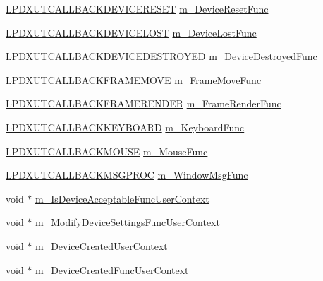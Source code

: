 \begin{DoxyCompactItemize}
\item 
\hyperlink{_d_x_u_t_8h_a67752d19953202f34e9f4d8826ee611a}{LPDXUTCALLBACKDEVICERESET} \hyperlink{struct_d_x_u_t_state_1_1_s_t_a_t_e_a43037d71aca77c10dffff7b8179b19af}{m\_\-DeviceResetFunc}
\item 
\hyperlink{_d_x_u_t_8h_a38bc1228fe056e0cd5860f48ee6291df}{LPDXUTCALLBACKDEVICELOST} \hyperlink{struct_d_x_u_t_state_1_1_s_t_a_t_e_ae96efa2807511ec6cb879e114ced252d}{m\_\-DeviceLostFunc}
\item 
\hyperlink{_d_x_u_t_8h_a1e80f441066b65558266d7a5770cbb6f}{LPDXUTCALLBACKDEVICEDESTROYED} \hyperlink{struct_d_x_u_t_state_1_1_s_t_a_t_e_af060474ffdb37388674f998c6aca5ea8}{m\_\-DeviceDestroyedFunc}
\item 
\hyperlink{_d_x_u_t_8h_a3eeca871425fb8ff60e4e76cbedebed4}{LPDXUTCALLBACKFRAMEMOVE} \hyperlink{struct_d_x_u_t_state_1_1_s_t_a_t_e_a252a76131c7d17c44841faf8abca7691}{m\_\-FrameMoveFunc}
\item 
\hyperlink{_d_x_u_t_8h_a16135d638bce122f8d286b028d027810}{LPDXUTCALLBACKFRAMERENDER} \hyperlink{struct_d_x_u_t_state_1_1_s_t_a_t_e_a84b307c15966a8fb5d91b9657b16f7c3}{m\_\-FrameRenderFunc}
\item 
\hyperlink{_d_x_u_t_8h_a194e486838161abf400b6c63ae43da9e}{LPDXUTCALLBACKKEYBOARD} \hyperlink{struct_d_x_u_t_state_1_1_s_t_a_t_e_a734b59a8d704517fcea16ae79983151e}{m\_\-KeyboardFunc}
\item 
\hyperlink{_d_x_u_t_8h_a5aeb28f9c5f4d5cbd36381f30b92b51a}{LPDXUTCALLBACKMOUSE} \hyperlink{struct_d_x_u_t_state_1_1_s_t_a_t_e_a92ce70e6a56d51f8f281cb3d91ed150a}{m\_\-MouseFunc}
\item 
\hyperlink{_d_x_u_t_8h_a284dfd4bc64f5867e8198cd565bd4fc7}{LPDXUTCALLBACKMSGPROC} \hyperlink{struct_d_x_u_t_state_1_1_s_t_a_t_e_ac46ec283780560f0b7689489cc04783b}{m\_\-WindowMsgFunc}
\item 
void $\ast$ \hyperlink{struct_d_x_u_t_state_1_1_s_t_a_t_e_a48ae3c4bfb4debc93122adafbfe0952c}{m\_\-IsDeviceAcceptableFuncUserContext}
\item 
void $\ast$ \hyperlink{struct_d_x_u_t_state_1_1_s_t_a_t_e_aa82feb03854adbaa82dcad585968f0af}{m\_\-ModifyDeviceSettingsFuncUserContext}
\item 
void $\ast$ \hyperlink{struct_d_x_u_t_state_1_1_s_t_a_t_e_a1c40c42e9a4cdebef7c28efb6ef5a362}{m\_\-DeviceCreatedUserContext}
\item 
void $\ast$ \hyperlink{struct_d_x_u_t_state_1_1_s_t_a_t_e_a6fa99b3f8f69a103630c293f1397a10a}{m\_\-DeviceCreatedFuncUserContext}
\item 

\end{DoxyCompactItemize}
